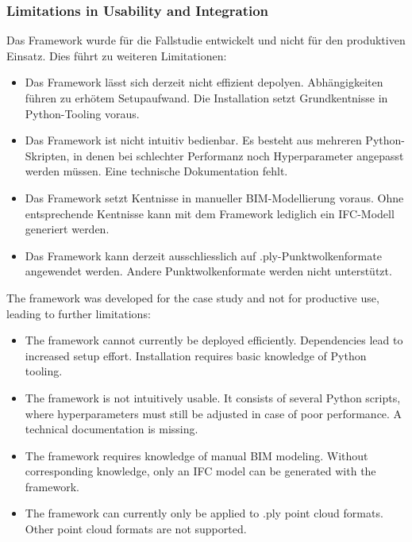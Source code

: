 \subsubsection{Limitations in Usability and Integration}
\begin{German}
    Das Framework wurde für die Fallstudie entwickelt und nicht für den produktiven Einsatz. Dies führt zu weiteren Limitationen:

    \begin{itemize}
        \item Das Framework lässt sich derzeit nicht effizient depolyen. Abhängigkeiten führen zu erhötem Setupaufwand. Die Installation setzt Grundkentnisse in Python-Tooling voraus.
        \item Das Framework ist nicht intuitiv bedienbar. Es besteht aus mehreren Python-Skripten, in denen bei schlechter Performanz noch Hyperparameter angepasst werden müssen. Eine technische Dokumentation fehlt.
        \item Das Framework setzt Kentnisse in manueller BIM-Modellierung voraus. Ohne entsprechende Kentnisse kann mit dem Framework lediglich ein IFC-Modell generiert werden. 
        \item Das Framework kann derzeit ausschliesslich auf .ply-Punktwolkenformate angewendet werden. Andere Punktwolkenformate werden nicht unterstützt.
    \end{itemize}
\end{German}

\begin{English}
    The framework was developed for the case study and not for productive use, leading to further limitations:

    \begin{itemize}
        \item The framework cannot currently be deployed efficiently. Dependencies lead to increased setup effort. Installation requires basic knowledge of Python tooling.
        \item The framework is not intuitively usable. It consists of several Python scripts, where hyperparameters must still be adjusted in case of poor performance. A technical documentation is missing.
        \item The framework requires knowledge of manual BIM modeling. Without corresponding knowledge, only an IFC model can be generated with the framework.
        \item The framework can currently only be applied to .ply point cloud formats. Other point cloud formats are not supported.
    \end{itemize}
\end{English}

